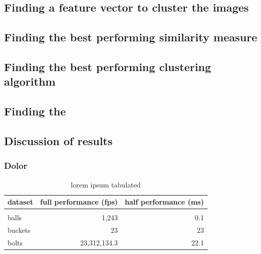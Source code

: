 \documentclass[journal]{vgtc}       %
\begin{document}
\subsection{Finding a feature vector to cluster the images}
\subsection{Finding the best performing similarity measure}
\subsection{Finding the best performing clustering algorithm}
\subsection{Finding the }
\subsection{Discussion of results}
\subsubsection{Dolor}

\begin{table}
\caption{
\label{tab:perf} lorem ipsum tabulated}
\centering
\vspace{0.3em}
\begin{tabular}{lrr}
dataset & full performance (fps) & half performance (ms)\\ \hline\\[-0.4em]
balls & 1,243 & 0.1 \\
buckets & 23 & 23 \\
bolts & 23,312,134.3 & 22.1 \\
\end{tabular}
\end{table}






\end{document}
